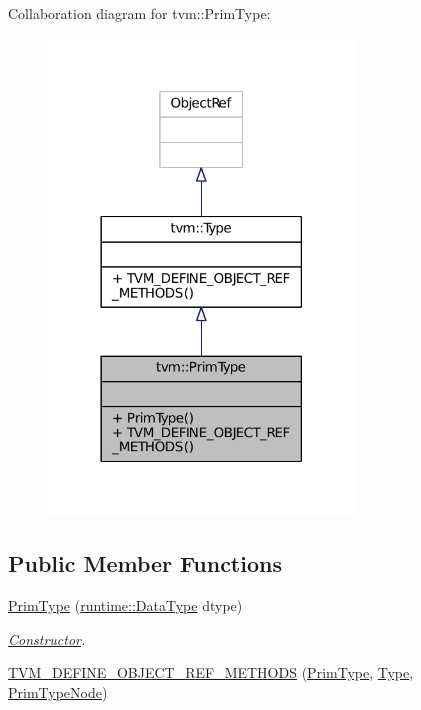 Collaboration diagram for tvm\+:\+:Prim\+Type\+:
\nopagebreak
\begin{figure}[H]
\begin{center}
\leavevmode
\includegraphics[width=230pt]{classtvm_1_1PrimType__coll__graph}
\end{center}
\end{figure}
\subsection*{Public Member Functions}
\begin{DoxyCompactItemize}
\item 
\hyperlink{classtvm_1_1PrimType_a09f20c21115c93112848ee1aa91a02a4}{Prim\+Type} (\hyperlink{classtvm_1_1runtime_1_1DataType}{runtime\+::\+Data\+Type} dtype)
\begin{DoxyCompactList}\small\item\em \hyperlink{classtvm_1_1Constructor}{Constructor}. \end{DoxyCompactList}\item 
\hyperlink{classtvm_1_1PrimType_a6590f43a3e2ac4eab09a606ae068ed83}{T\+V\+M\+\_\+\+D\+E\+F\+I\+N\+E\+\_\+\+O\+B\+J\+E\+C\+T\+\_\+\+R\+E\+F\+\_\+\+M\+E\+T\+H\+O\+DS} (\hyperlink{classtvm_1_1PrimType}{Prim\+Type}, \hyperlink{classtvm_1_1Type}{Type}, \hyperlink{classtvm_1_1PrimTypeNode}{Prim\+Type\+Node})
\end{DoxyCompactItemize}


